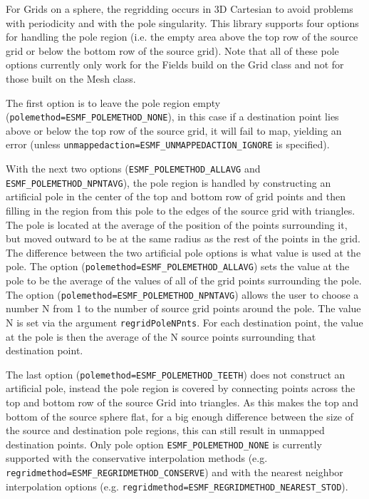 For Grids on a sphere, the regridding occurs in 3D Cartesian to avoid
problems with periodicity and with the pole singularity. This library
 supports four options for handling the pole region (i.e. the empty area above the top row of the source grid or below
 the bottom row of the source grid).  Note that all of these pole options currently only work for the Fields build on the Grid class and not for those built on 
 the Mesh class. 

 The first option is to leave the pole region empty ({\tt polemethod=ESMF\_POLEMETHOD\_NONE}), in this 
 case if a destination point lies above or below the 
 top row of the source grid, it will fail to map, yielding an error (unless {\tt unmappedaction=ESMF\_UNMAPPEDACTION\_IGNORE} is specified).  

 With the next two options ({\tt ESMF\_POLEMETHOD\_ALLAVG} and {\tt ESMF\_POLEMETHOD\_NPNTAVG}), the pole region is handled by constructing 
 an artificial pole in the center of the top and bottom row of grid points and then filling
 in the region from this pole to the edges of the source grid with triangles. 
 The pole is located at the average of the position of the points surrounding
 it, but moved outward to be at the same radius as the rest of the points
 in the grid. The difference between the two artificial pole options is what value is used at the pole. 
 The option ({\tt polemethod=ESMF\_POLEMETHOD\_ALLAVG}) sets the value at the pole to be the average of the values
 of all of the grid points surrounding the pole. The option ({\tt polemethod=ESMF\_POLEMETHOD\_NPNTAVG}) allows the user to choose
 a number N from 1 to the number of source grid points around the pole. The value N is set via the argument {\tt regridPoleNPnts}. For
 each destination point, the value at the pole is then the average of the N source points
 surrounding that destination point. 

 The last option ({\tt polemethod=ESMF\_POLEMETHOD\_TEETH}) does not construct an artificial pole, instead the
 pole region is covered by connecting points across the top and bottom row of the source Grid into triangles. As 
 this makes the top and bottom of the source sphere flat, for a big enough difference between the size of
 the source and destination pole regions, this can still result in unmapped destination points.  
 Only pole option {\tt ESMF\_POLEMETHOD\_NONE} is currently supported with the conservative interpolation methods 
 (e.g. {\tt regridmethod=ESMF\_REGRIDMETHOD\_CONSERVE}) and with the nearest neighbor interpolation options (e.g. {\tt regridmethod=ESMF\_REGRIDMETHOD\_NEAREST\_STOD}).


